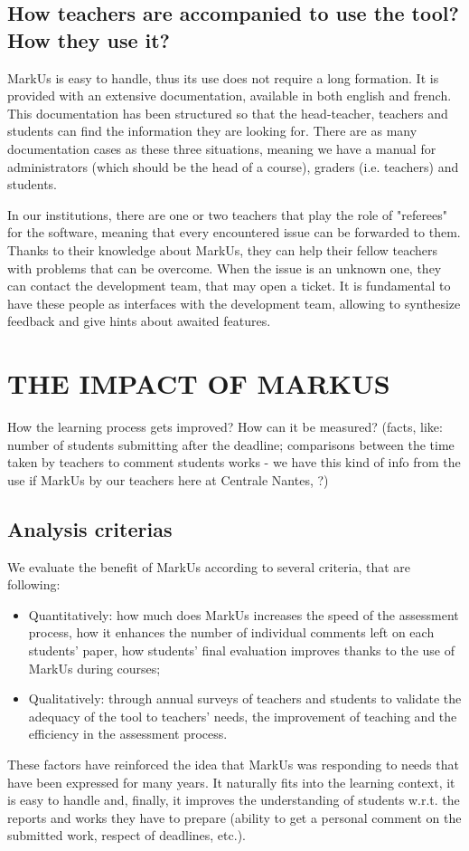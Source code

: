 \documentclass[twocolumn,10pt]{asme2e}
\begin{document}
\subsection*{How teachers are accompanied to use the tool? How they use it?}

MarkUs is easy to handle, thus its use does not require a long formation. It
is provided with an extensive documentation, available in both english and
french. This documentation has been structured so that the head-teacher,
teachers and students can find the information they are looking for. There are
as many documentation cases as these three situations, meaning we have a
manual for administrators (which should be the head of a course), graders
(i.e. teachers) and students. 

In our institutions, there are one or two teachers that play the role of "referees" for the software, meaning that every encountered issue can be forwarded to them. Thanks to their knowledge about MarkUs, they can help their fellow teachers with problems that can be overcome. When the issue is an unknown one, they can contact the development team, that may open a ticket. It is fundamental to have these people as interfaces with the development team, allowing to synthesize feedback and give hints about awaited features. 

\section*{THE IMPACT OF MARKUS}

How the learning process gets improved? How can it be measured? (facts, like: number of students submitting after the deadline; comparisons between the time taken by teachers to comment students works - we have this kind of info from the use if MarkUs by our teachers here at Centrale Nantes, ?)

\subsection*{Analysis criterias}

We evaluate the benefit of MarkUs according to several criteria, that are following: 
\begin{itemize}
\item Quantitatively: how much does MarkUs increases the speed of the assessment process, how it enhances the number of individual comments left on each students' paper, how students' final evaluation improves thanks to the use of MarkUs during courses;
\item Qualitatively: through annual surveys of teachers and students to validate the adequacy of the tool to teachers' needs, the improvement of teaching and the efficiency in the assessment process.
\end{itemize}
These factors have reinforced the idea that MarkUs was responding to needs that have been expressed for many years. It naturally fits into the learning context, it is easy to handle and, finally, it improves the understanding of students w.r.t. the reports and works they have to prepare (ability to get a personal comment on the submitted work, respect of deadlines, etc.).
\end{document}
